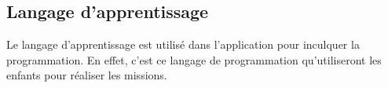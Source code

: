 


\subsection{Langage d'apprentissage}
Le langage d'apprentissage est utilisé dans l'application pour inculquer la programmation. En effet, c'est ce langage de programmation qu'utiliseront les enfants pour réaliser les missions.

